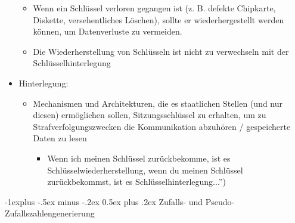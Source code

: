 \documentclass[a4paper]{article}
\makeatletter
\renewcommand{\subsection}{\@startsection{subsection}{2}{0mm}%
 {-1explus -.5ex minus -.2ex}%
 {0.5ex plus .2ex}%
 {\normalfont\normalsize\bfseries}}
\makeatother
\begin{document}
\begin{multicols}{3}
\begin{itemize}
              \begin{itemize}
                  \item
                        Wenn ein Schlüssel verloren gegangen ist (z. B. defekte Chipkarte,
                        Diskette, versehentliches Löschen), sollte er wiederhergestellt
                        werden können, um Datenverluste zu vermeiden.
                  \item
                        Die Wiederherstellung von Schlüsseln ist nicht zu verwechseln mit
                        der Schlüsselhinterlegung
              \end{itemize}
        \item
              Hinterlegung:

              \begin{itemize}
                  \item
                        Mechanismen und Architekturen, die es staatlichen Stellen (und nur
                        diesen) ermöglichen sollen, Sitzungsschlüssel zu erhalten, um zu
                        Strafverfolgungszwecken die Kommunikation abzuhören / gespeicherte
                        Daten zu lesen

                        \begin{itemize}
                            \item
                                  Wenn ich meinen Schlüssel zurückbekomme, ist es
                                  Schlüsselwiederherstellung, wenn du meinen Schlüssel
                                  zurückbekommst, ist es Schlüsselhinterlegung...'')
                        \end{itemize}
              \end{itemize}
    \end{itemize}


    \subsection{Zufalls- und
        Pseudo-Zufallszahlengenerierung}


\end{multicols}
\end{document}
